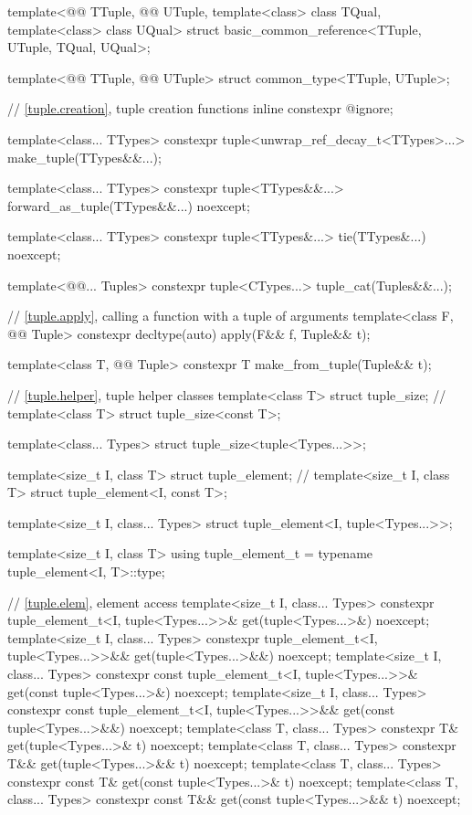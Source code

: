 \documentclass{wg21}
\begin{document}
\begin{addedblock}
\begin{codeblock}
template<@@ TTuple, @@ UTuple, template<class> class TQual, template<class> class UQual>
struct basic_common_reference<TTuple, UTuple, TQual, UQual>;

template<@@ TTuple, @@ UTuple>
struct common_type<TTuple, UTuple>;
\end{codeblock}
\end{addedblock}
\begin{codeblock}

// \ref{tuple.creation}, tuple creation functions
inline constexpr @\unspec@ ignore;

template<class... TTypes>
constexpr tuple<unwrap_ref_decay_t<TTypes>...> make_tuple(TTypes&&...);

template<class... TTypes>
constexpr tuple<TTypes&&...> forward_as_tuple(TTypes&&...) noexcept;

template<class... TTypes>
constexpr tuple<TTypes&...> tie(TTypes&...) noexcept;

template<@@... Tuples>
constexpr tuple<CTypes...> tuple_cat(Tuples&&...);

// \ref{tuple.apply}, calling a function with a tuple of arguments
template<class F, @@ Tuple>
constexpr decltype(auto) apply(F&& f, Tuple&& t);

template<class T, @@ Tuple>
constexpr T make_from_tuple(Tuple&& t);

// \ref{tuple.helper}, tuple helper classes
template<class T> struct tuple_size;                  // \notdef
template<class T> struct tuple_size<const T>;

template<class... Types> struct tuple_size<tuple<Types...>>;

template<size_t I, class T> struct tuple_element;     // \notdef
template<size_t I, class T> struct tuple_element<I, const T>;

template<size_t I, class... Types>
struct tuple_element<I, tuple<Types...>>;

template<size_t I, class T>
using tuple_element_t = typename tuple_element<I, T>::type;

// \ref{tuple.elem}, element access
template<size_t I, class... Types>
constexpr tuple_element_t<I, tuple<Types...>>& get(tuple<Types...>&) noexcept;
template<size_t I, class... Types>
constexpr tuple_element_t<I, tuple<Types...>>&& get(tuple<Types...>&&) noexcept;
template<size_t I, class... Types>
constexpr const tuple_element_t<I, tuple<Types...>>& get(const tuple<Types...>&) noexcept;
template<size_t I, class... Types>
constexpr const tuple_element_t<I, tuple<Types...>>&& get(const tuple<Types...>&&) noexcept;
template<class T, class... Types>
constexpr T& get(tuple<Types...>& t) noexcept;
template<class T, class... Types>
constexpr T&& get(tuple<Types...>&& t) noexcept;
template<class T, class... Types>
constexpr const T& get(const tuple<Types...>& t) noexcept;
template<class T, class... Types>
constexpr const T&& get(const tuple<Types...>&& t) noexcept;


\end{codeblock}
\end{document}
